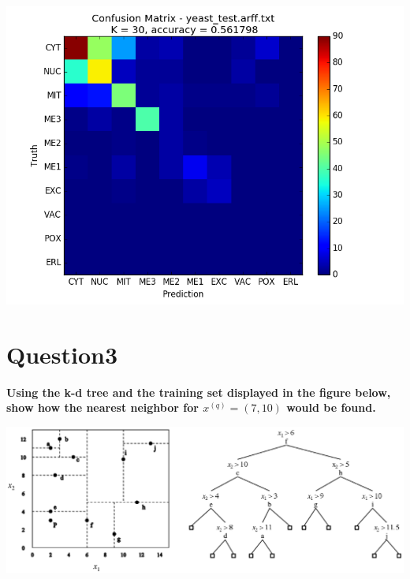 \documentclass[paper=a4, fontsize=11pt]{scrartcl} %
\numberwithin{equation}{section} %
\numberwithin{figure}{section} %
\numberwithin{table}{section} %
\begin{document}
\begin{center}
\includegraphics[scale=.6]{pics/hw2_2_3_2.png}
\end{center}


\newpage
\section*{Question3}

\textbf{Using the k-d tree and the training set displayed in the figure below, show how the nearest neighbor for $x^{(q)} = (7, 10)$ would be found.\\}

\includegraphics[scale=.4]{pics/question3.png}
\end{document}
